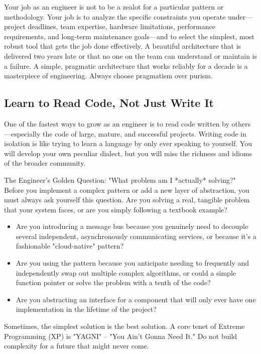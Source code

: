Your job as an engineer is not to be a zealot for a particular pattern or methodology. Your job is to analyze the specific constraints you operate under—project deadlines, team expertise, hardware limitations, performance requirements, and long-term maintenance goals—and to select the simplest, most robust tool that gets the job done effectively. A beautiful architecture that is delivered two years late or that no one on the team can understand or maintain is a failure. A simple, pragmatic architecture that works reliably for a decade is a masterpiece of engineering. Always choose pragmatism over purism.


\subsection{Learn to Read Code, Not Just Write It}
\label{subsec:learn_to_read}

One of the fastest ways to grow as an engineer is to read code written by others—especially the code of large, mature, and successful projects. Writing code in isolation is like trying to learn a language by only ever speaking to yourself. You will develop your own peculiar dialect, but you will miss the richness and idioms of the broader community.

\begin{principlebox}{The Engineer's Golden Question: "What problem am I *actually* solving?"}
    Before you implement a complex pattern or add a new layer of abstraction, you must always ask yourself this question. Are you solving a real, tangible problem that your system faces, or are you simply following a textbook example?
    \begin{itemize}
        \item Are you introducing a message bus because you genuinely need to decouple several independent, asynchronously communicating services, or because it's a fashionable "cloud-native" pattern?
        \item Are you using the  pattern because you anticipate needing to frequently and independently swap out multiple complex algorithms, or could a simple function pointer or  solve the problem with a tenth of the code?
        \item Are you abstracting an interface for a component that will only ever have one implementation in the lifetime of the project?
    \end{itemize}
    Sometimes, the simplest solution is the best solution. A core tenet of Extreme Programming (XP) is "YAGNI" – "You Ain't Gonna Need It." Do not build complexity for a future that might never come.
\end{principlebox}

